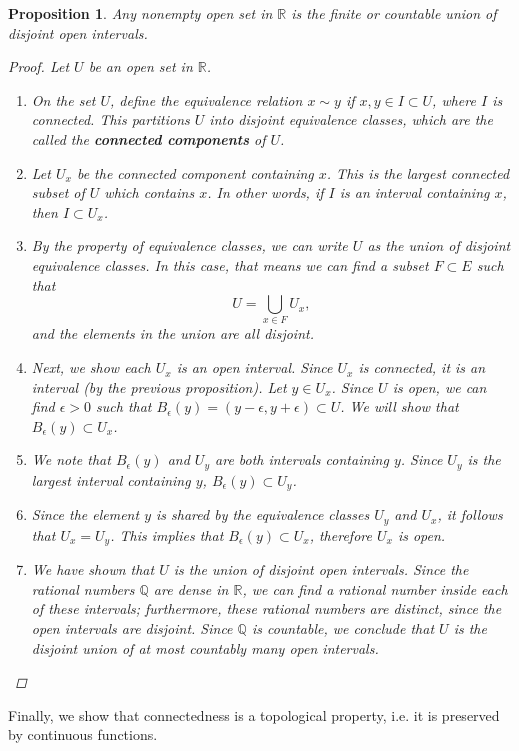 \documentclass[12pt]{amsart}         %
\newtheorem{proposition}{Proposition}[section]
\theoremstyle{remark}
\newcommand{\R}{\mathbb{R}}
\newcommand{\Q}{\mathbb{Q}}
\begin{document}
\begin{proposition}
Any nonempty open set in $\R$ is the finite or countable union of disjoint open intervals.
\begin{proof}
Let $U$ be an open set in $\R$.
\begin{enumerate}
\item On the set $U$, define the equivalence relation $x \sim y$ if $x, y \in I \subset U$, where $I$ is connected. This partitions $U$ into disjoint equivalence classes, which are the called the \textbf{connected components} of $U$.
\item Let $U_x$ be the connected component containing $x$. This is the largest connected subset of $U$ which contains $x$. In other words, if $I$ is an interval containing $x$, then $I \subset U_x$.
\item By the property of equivalence classes, we can write $U$ as the union of disjoint equivalence classes. In this case, that means we can find a subset $F \subset E$ such that 
\[
U = \bigcup_{x \in F}U_x,
\]
and the elements in the union are all disjoint.
\item Next, we show each $U_x$ is an open interval. Since $U_x$ is connected, it is an interval (by the previous proposition). Let $y \in U_x$. Since $U$ is open, we can find $\epsilon > 0$ such that $B_\epsilon(y) = (y-\epsilon, y+\epsilon) \subset U$. We will show that $B_\epsilon(y) \subset U_x$.
\item We note that $B_\epsilon(y)$ and $U_y$ are both intervals containing $y$. Since $U_y$ is the largest interval containing $y$, $B_\epsilon(y) \subset U_y$.
\item Since the element $y$ is shared by the equivalence classes $U_y$ and $U_x$, it follows that $U_x = U_y$. This implies that $B_\epsilon(y) \subset U_x$, therefore $U_x$ is open.
\item We have shown that $U$ is the union of disjoint open intervals. Since the rational numbers $\Q$ are dense in $\R$, we can find a rational number inside each of these intervals; furthermore, these rational numbers are distinct, since the open intervals are disjoint. Since $\Q$ is countable, we conclude that $U$ is the disjoint union of at most countably many open intervals.
\end{enumerate}
\end{proof}
\end{proposition}

Finally, we show that connectedness is a topological property, i.e. it is preserved by continuous functions.
\end{document}
